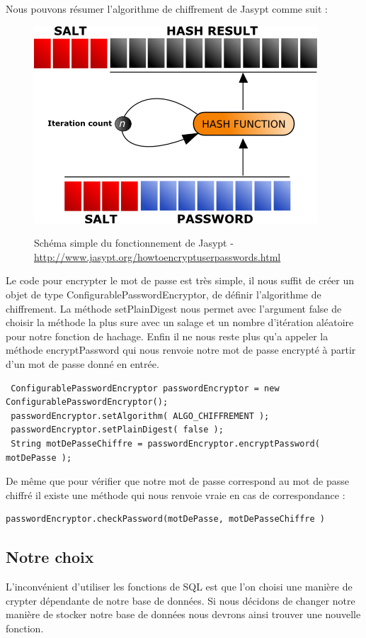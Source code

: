 Nous pouvons résumer l'algorithme de chiffrement de Jasypt comme suit :\\
\begin{figure}[H]
  \center
  \includegraphics[scale=0.7]{../graph/passwordEncryption.png} \\
  \caption{Schéma simple du fonctionnement de Jasypt - \url{http://www.jasypt.org/howtoencryptuserpasswords.html}}
\end{figure}
Le code pour encrypter le mot de passe est très simple, il nous suffit de créer un objet de type ConfigurablePasswordEncryptor, de définir l'algorithme de chiffrement. La méthode setPlainDigest nous permet avec l'argument false de choisir la méthode la plus sure avec un salage et un nombre d'itération aléatoire pour notre fonction de hachage. Enfin il ne nous reste plus qu'a appeler la méthode encryptPassword qui nous renvoie notre mot de passe encrypté à partir d'un mot de passe donné en entrée. 
\begin{lstlisting}
 ConfigurablePasswordEncryptor passwordEncryptor = new ConfigurablePasswordEncryptor();
 passwordEncryptor.setAlgorithm( ALGO_CHIFFREMENT );
 passwordEncryptor.setPlainDigest( false );
 String motDePasseChiffre = passwordEncryptor.encryptPassword( motDePasse );
\end{lstlisting} 


De même que pour vérifier que notre mot de passe correspond au mot de passe chiffré il existe une méthode qui nous renvoie vraie en cas de correspondance :

\begin{lstlisting}
passwordEncryptor.checkPassword(motDePasse, motDePasseChiffre )
\end{lstlisting}


\subsection{Notre choix}
L'inconvénient d'utiliser les fonctions de SQL est que l'on choisi une manière de crypter dépendante de notre base de données. Si nous décidons de changer notre manière de stocker notre base de données nous devrons ainsi trouver une nouvelle fonction. \\

